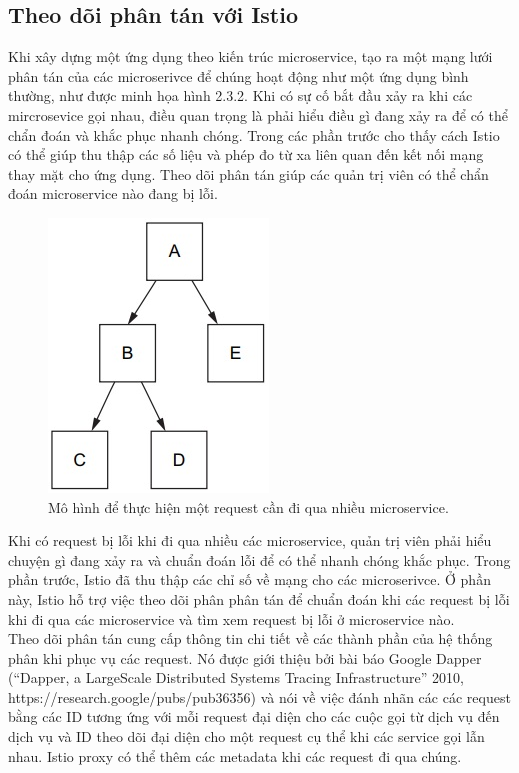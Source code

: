 \documentclass[12pt,a4paper]{report}
\begin{document}
{{\begin{figure}[h]
\end{figure}
	\subsection{Theo dõi phân tán với Istio}
		{\hspace{0.6cm}Khi xây dựng một ứng dụng theo kiến trúc microservice, tạo ra một mạng lưới phân tán của các microserivce để chúng hoạt động như một ứng dụng bình thường, như được minh họa hình 2.3.2. Khi có sự cố bắt đầu xảy ra khi các mircrosevice gọi nhau, điều quan trọng là phải hiểu điều gì đang xảy ra để có thể chẩn đoán và khắc phục nhanh chóng. Trong các phần trước cho thấy cách Istio có thể giúp thu thập các số liệu và phép đo từ xa liên quan đến kết nối mạng thay mặt cho ứng dụng. Theo dõi phân tán giúp các quản trị viên có thể chẩn đoán microservice nào đang bị lỗi.}\\
			
		\begin{figure}[h]
			\centering
			\includegraphics[width=0.3\linewidth]{Pics/Untitled}
			\caption{Mô hình để thực hiện một request cần đi qua nhiều microservice.}
			\label{fig:untitled}
		\end{figure}
	
		Khi có request bị lỗi khi đi qua nhiều các microservice, quản trị viên phải hiểu chuyện gì đang xảy ra và chuẩn đoán lỗi để có thể nhanh chóng khắc phục. Trong phần trước, Istio đã thu thập các chỉ số về mạng cho các microserivce. Ở phần này, Istio hỗ trợ việc theo dõi phân phân tán để chuẩn đoán khi các request bị lỗi khi đi qua các microservice và tìm xem request bị lỗi ở microservice nào.\\
		
		Theo dõi phân tán cung cấp thông tin chi tiết về các thành phần của hệ thống phân khi phục vụ các request. Nó được giới thiệu bởi bài báo Google Dapper (“Dapper, a LargeScale Distributed Systems Tracing Infrastructure” 2010, https://research.google/pubs/pub36356) 
		và nói về việc đánh nhãn các các request bằng các ID tương ứng với mỗi request đại diện cho các cuộc gọi từ dịch vụ đến dịch vụ và ID theo dõi đại diện cho một request cụ thể khi các service gọi lẫn nhau. Istio proxy có thể thêm các metadata khi các request đi qua chúng.\\
		
}}
\end{document}
